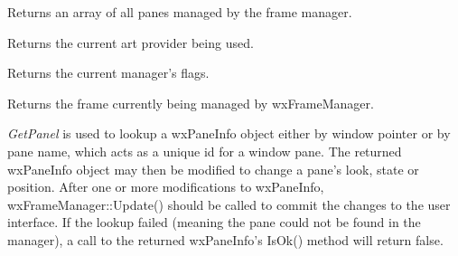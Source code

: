 \label{wxframemanagergetallpanes}


Returns an array of all panes managed by the frame manager.

\label{wxframemanagergetartprovider}


Returns the current art provider being used.

\label{wxframemanagergetdockpixeloffset}



\label{wxframemanagergetflags}


Returns the current manager's flags.

\label{wxframemanagergetmanagedwindow}


Returns the frame currently being managed by wxFrameManager.

\label{wxframemanagergetpane}


{\it GetPanel} is used to lookup a wxPaneInfo object
either by window pointer or by pane name, which acts as a unique id for
a window pane. The returned wxPaneInfo object may then be modified to
change a pane's look, state or position. After one or more
modifications to wxPaneInfo, wxFrameManager::Update() should be called
to commit the changes to the user interface. If the lookup failed
(meaning the pane could not be found in the manager), a call to the
returned wxPaneInfo's IsOk() method will return false.



\label{wxframemanagergetpanepart}



\label{wxframemanagergetpanepositionsandsizes}

